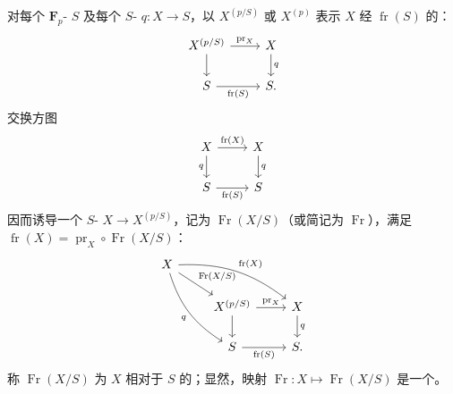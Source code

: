 对每个 $\mathbf F_p$- $S$ 及每个 $S$- $q:X\to S$，以 $X^{(p/S)}$ 或 $X^{(p)}$ 表示 $X$ 经 $\operatorname{fr}(S)$ 的：
\[
\begin{tikzcd}
X^{(p/S)}\arrow[r,"\operatorname{pr}_X"]\arrow[d]&X\arrow[d,"q"]\\
S\arrow[r,"\operatorname{fr}(S)"']&S.
\end{tikzcd}
\]
交换方图
\[
\begin{tikzcd}
X\arrow[r,"\operatorname{fr}(X)"]\arrow[d,"q"']&X\arrow[d,"q"]\\
S\arrow[r,"\operatorname{fr}(S)"']&S
\end{tikzcd}
\]
因而诱导一个 $S$- $X\to X^{(p/S)}$，记为 $\operatorname{Fr}(X/S)$（或简记为 $\operatorname{Fr}$），满足 $\operatorname{fr}(X)=\operatorname{pr}_X\circ\operatorname{Fr}(X/S)$：
\[
\begin{tikzcd}
X\arrow[dr,"\operatorname{Fr}(X/S)"]\arrow[drr,bend left=20,"\operatorname{fr}(X)"]\arrow[ddr,bend right=20,"q"']&&\\
&X^{(p/S)}\arrow[r,"\operatorname{pr}_X"]\arrow[d]&X\arrow[d,"q"]\\
&S\arrow[r,"\operatorname{fr}(S)"']&S.
\end{tikzcd}
\]
称 $\operatorname{Fr}(X/S)$ 为 $X$ 相对于 $S$ 的；显然，映射 $\operatorname{Fr}:X\mapsto\operatorname{Fr}(X/S)$ 是一个。

